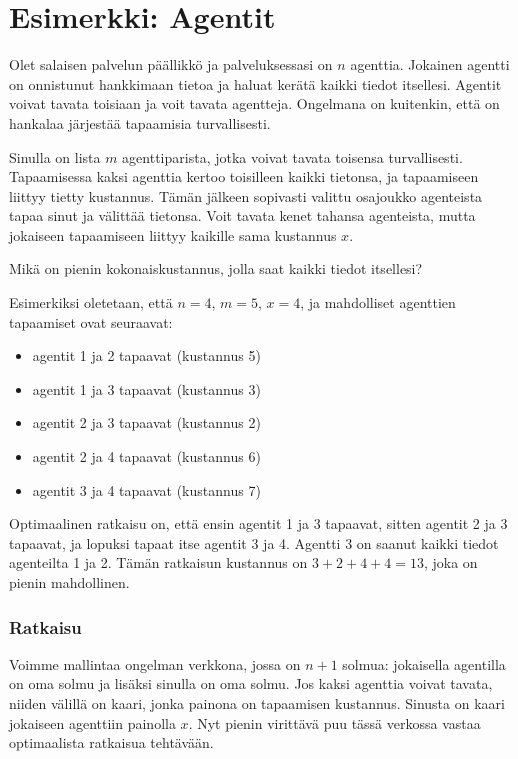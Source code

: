 \section{Esimerkki: Agentit}

Olet salaisen palvelun päällikkö ja palveluksessasi on $n$ agenttia.
Jokainen agentti on onnistunut hankkimaan tietoa ja haluat kerätä
kaikki tiedot itsellesi.
Agentit voivat tavata toisiaan ja voit tavata agentteja.
Ongelmana on kuitenkin, että on hankalaa järjestää tapaamisia turvallisesti.

Sinulla on lista $m$ agenttiparista, jotka voivat tavata toisensa turvallisesti.
Tapaamisessa kaksi agenttia kertoo toisilleen kaikki tietonsa,
ja tapaamiseen liittyy tietty kustannus.
Tämän jälkeen sopivasti valittu osajoukko agenteista tapaa sinut ja välittää tietonsa.
Voit tavata kenet tahansa agenteista, mutta jokaiseen tapaamiseen liittyy
kaikille sama kustannus $x$.

Mikä on pienin kokonaiskustannus, jolla saat kaikki tiedot itsellesi?

Esimerkiksi oletetaan, että $n=4$, $m=5$, $x=4$,
ja mahdolliset agenttien tapaamiset ovat seuraavat:

\begin{itemize}
\item agentit 1 ja 2 tapaavat (kustannus 5)
\item agentit 1 ja 3 tapaavat (kustannus 3)
\item agentit 2 ja 3 tapaavat (kustannus 2)
\item agentit 2 ja 4 tapaavat (kustannus 6)
\item agentit 3 ja 4 tapaavat (kustannus 7)
\end{itemize}

Optimaalinen ratkaisu on, että ensin agentit 1 ja 3 tapaavat,
sitten agentit 2 ja 3 tapaavat, ja lopuksi tapaat itse agentit 3 ja 4.
Agentti 3 on saanut kaikki tiedot agenteilta 1 ja 2.
Tämän ratkaisun kustannus on $3+2+4+4=13$, joka on pienin mahdollinen.

\subsubsection{Ratkaisu}

Voimme mallintaa ongelman verkkona, jossa on $n+1$ solmua:
jokaisella agentilla on oma solmu ja lisäksi sinulla on oma solmu.
Jos kaksi agenttia voivat tavata, niiden välillä on kaari,
jonka painona on tapaamisen kustannus.
Sinusta on kaari jokaiseen agenttiin painolla $x$.
Nyt pienin virittävä puu tässä verkossa vastaa optimaalista ratkaisua tehtävään.

